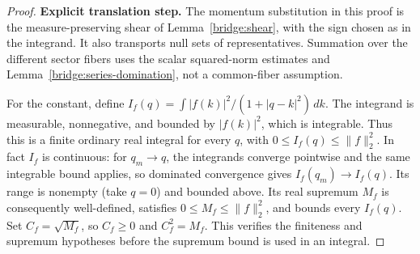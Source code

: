 \documentclass[11pt,a4paper]{article}
\theoremstyle{definition}
\theoremstyle{remark}
\begin{document}
\begin{proof}
\noindent\textbf{Explicit translation step.} The momentum substitution in this proof is the measure-preserving
shear of Lemma~\ref{bridge:shear}, with the sign chosen as in the
integrand. It also transports null sets of representatives. Summation
over the different sector fibers uses the scalar squared-norm estimates
and Lemma~\ref{bridge:series-domination}, not a common-fiber assumption.

For the constant, define
$I_f(q)=\int |f(k)|^2/(1+|q-k|^2)\,dk$.
The integrand is measurable, nonnegative, and bounded by
$|f(k)|^2$, which is integrable. Thus this is a finite ordinary
real integral for every $q$, with
$0\leq I_f(q)\leq\|f\|_2^2$.
In fact $I_f$ is continuous: for $q_m\to q$, the integrands
converge pointwise and the same integrable bound applies, so
dominated convergence gives $I_f(q_m)\to I_f(q)$.
Its range is nonempty (take $q=0$) and bounded above. Its real
supremum $M_f$ is consequently well-defined, satisfies
$0\leq M_f\leq\|f\|_2^2$, and bounds every $I_f(q)$.
Set $C_f=\sqrt{M_f}$, so $C_f\geq0$ and $C_f^2=M_f$.
This verifies the finiteness and supremum hypotheses before
the supremum bound is used in an integral.


\end{proof}
\end{document}
